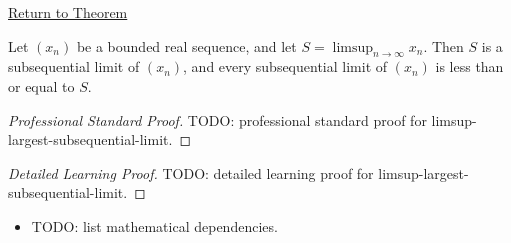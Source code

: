 \newpage
{}
\label{prf:limsup-largest-subsequential-limit}

\begin{remark*}[Return]
\hyperref[thm:limsup-largest-subsequential-limit]{Return to Theorem}
\end{remark*}

\begin{theorem*}
Let $(x_n)$ be a bounded real sequence, and let
$S=\limsup_{n\to\infty}x_n$. Then $S$ is a subsequential limit of
$(x_n)$, and every subsequential limit of $(x_n)$ is less than or equal
to $S$.

\smallskip
\noindent
\end{theorem*}

\begin{proof}[Professional Standard Proof]
\LRAProofBodyStart
TODO: professional standard proof for limsup-largest-subsequential-limit.
\end{proof}

\begin{proof}[Detailed Learning Proof]
\LRAProofBodyStart
TODO: detailed learning proof for limsup-largest-subsequential-limit.
\end{proof}

\begin{remark*}
\end{remark*}

\begin{dependencies}
\begin{itemize}
  \item TODO: list mathematical dependencies.
\end{itemize}
\end{dependencies}

\clearpage
